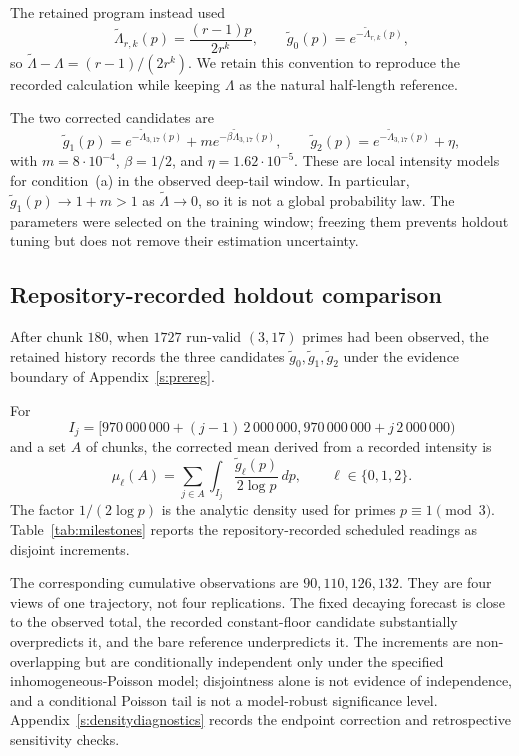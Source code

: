 The retained program instead used
\[
  \widetilde\Lambda_{r,k}(p)=\frac{(r-1)p}{2r^k},
  \qquad
  \widetilde g_0(p)=e^{-\widetilde\Lambda_{r,k}(p)},
\]
so $\widetilde\Lambda-\Lambda=(r-1)/(2r^k)$. We retain this convention to
reproduce the recorded calculation while keeping $\Lambda$ as the natural
half-length reference.

\begin{remark}\label{r:domain}
The two corrected candidates are
\[
  \widetilde g_{1}(p)=e^{-\widetilde\Lambda_{3,17}(p)}
            +m e^{-\beta\widetilde\Lambda_{3,17}(p)},
  \qquad
  \widetilde g_{2}(p)=e^{-\widetilde\Lambda_{3,17}(p)}+\eta,
\]
with $m=8\cdot10^{-4}$, $\beta=1/2$, and
$\eta=1.62\cdot10^{-5}$.  These are local intensity models for condition~(a)
in the observed deep-tail window.  In particular,
$\widetilde g_1(p)\to1+m>1$ as $\widetilde\Lambda\to0$, so it is not a global
probability law.  The parameters were selected on the training window;
freezing them prevents holdout tuning but does not remove their estimation
uncertainty.
\end{remark}

\subsection{Repository-recorded holdout comparison}\label{ss:eta}

After chunk $180$, when $1727$ run-valid $(3,17)$ primes had been observed,
the retained history records the three candidates
$\widetilde g_0,\widetilde g_1,\widetilde g_2$ under the evidence boundary of
Appendix~\ref{s:prereg}.

For
\[
 I_j=[970\,000\,000+(j-1)\,2\,000\,000,
      970\,000\,000+j\,2\,000\,000)
\]
and a set $A$ of chunks, the corrected mean derived from a recorded intensity is
\[
  \mu_\ell(A)=\sum_{j\in A}\int_{I_j}
      \frac{\widetilde g_\ell(p)}{2\log p}\,dp,
  \qquad \ell\in\{0,1,2\}.
\]
The factor $1/(2\log p)$ is the analytic density used for primes
$p\equiv1\pmod3$. Table~\ref{tab:milestones} reports the repository-recorded
scheduled readings as disjoint increments.



The corresponding cumulative observations are $90,110,126,132$.  They are
four views of one trajectory, not four replications.  The fixed decaying
forecast is close to the observed total, the recorded constant-floor candidate
substantially overpredicts it, and the bare reference underpredicts it.  The
increments are non-overlapping but are conditionally independent only under
the specified inhomogeneous-Poisson model; disjointness alone is not evidence
of independence, and a conditional Poisson tail is not a model-robust
significance level.  Appendix~\ref{s:densitydiagnostics} records the endpoint
correction and retrospective sensitivity checks.

